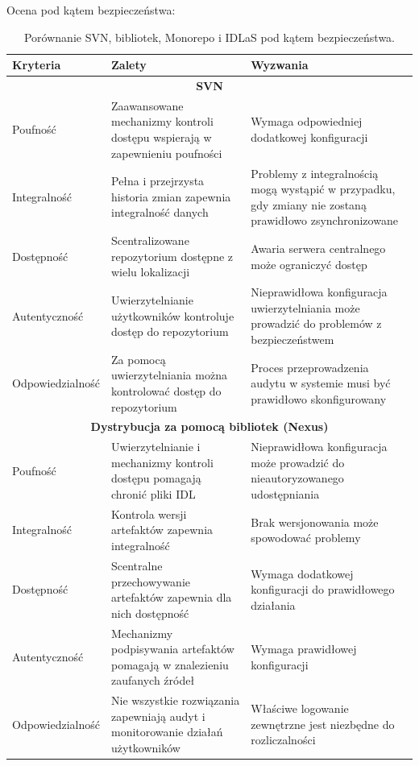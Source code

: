 \documentclass[runningheads,12pt]{llncs}
\begin{document}
Ocena pod kątem bezpieczeństwa:
\begin{longtable}{|p{4cm}|p{4cm}|p{4cm}|}
    \caption{Porównanie SVN, bibliotek, Monorepo i IDLaS pod kątem bezpieczeństwa.} \\
    \hline
    \textbf{Kryteria} & \textbf{Zalety} & \textbf{Wyzwania} \\ \hline
    \multicolumn{3}{|c|}{\textbf{SVN }} \\ \hline
    Poufność & Zaawansowane mechanizmy kontroli dostępu wspierają w zapewnieniu poufności & Wymaga odpowiedniej dodatkowej konfiguracji \\ \hline
    Integralność & Pełna i przejrzysta historia zmian zapewnia integralność danych & Problemy z integralnością mogą wystąpić w przypadku, gdy zmiany nie zostaną prawidłowo zsynchronizowane \\ \hline
    Dostępność & Scentralizowane repozytorium dostępne z wielu lokalizacji & Awaria serwera centralnego może ograniczyć dostęp \\ \hline
    Autentyczność & Uwierzytelnianie użytkowników kontroluje dostęp do repozytorium & Nieprawidłowa konfiguracja uwierzytelniania może prowadzić do problemów z bezpieczeństwem \\ \hline
    Odpowiedzialność & Za pomocą uwierzytelniania można kontrolować dostęp do repozytorium & Proces przeprowadzenia audytu w systemie musi być prawidłowo skonfigurowany \\ \hline
    \multicolumn{3}{|c|}{\textbf{Dystrybucja za pomocą bibliotek (Nexus)}} \\ \hline
    Poufność & Uwierzytelnianie i mechanizmy kontroli dostępu pomagają chronić pliki IDL & Nieprawidłowa konfiguracja może prowadzić do nieautoryzowanego udostępniania \\ \hline
    Integralność & Kontrola wersji artefaktów zapewnia integralność & Brak wersjonowania może spowodować problemy \\ \hline
    Dostępność & Scentralne przechowywanie artefaktów zapewnia dla nich dostępność & Wymaga dodatkowej konfiguracji do prawidłowego działania \\ \hline
    Autentyczność & Mechanizmy podpisywania artefaktów pomagają w znalezieniu zaufanych źródeł & Wymaga prawidłowej konfiguracji \\ \hline
    Odpowiedzialność & Nie wszystkie rozwiązania zapewniają audyt i monitorowanie działań użytkowników & Właściwe logowanie zewnętrzne jest niezbędne do rozliczalności \\ \hline

\end{longtable}
\end{document}
